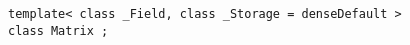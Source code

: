 {
	\small
\begin{lstlisting}
template< class _Field, class _Storage = denseDefault >
class Matrix ;
\end{lstlisting}
}

